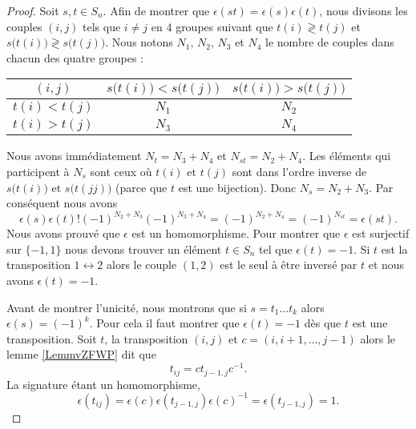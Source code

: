 \begin{proof}
    Soit \( s,t\in S_n\). Afin de montrer que \( \epsilon(st)=\epsilon(s)\epsilon(t)\), nous divisons les couples \( (i,j)\) tels que \( i\neq j\) en \( 4\) groupes suivant que \( t(i)\gtrless t(j)\) et \( s\big( t(i) \big)\gtrless s\big( t(j) \big)\). Nous notons \( N_1\), \( N_2\), \( N_3\) et \( N_4\) le nombre de couples dans chacun des quatre groupes :
    \begin{center}
    \begin{tabular}{c|c|c}
        $ (i,j)$&   \( s\big( t(i) \big)<s\big( t(j) \big)\)    &   \( s\big( t(i) \big)>s\big( t(j) \big)\)\\
        \hline
        \( t(i)<t(j)\)& \( N_1\)&\( N_2\)\\
        \hline
        \( t(i)>t(j)\)&\( N_3\)&\( N_4\)
    \end{tabular}
    \end{center}
    Nous avons immédiatement \( N_t=N_3+N_4\) et \( N_{st}=N_2+N_4\). Les éléments qui participent à \( N_s\) sont ceux où \( t(i)\) et \( t(j)\) sont dans l'ordre inverse de \( s\big( t(i) \big)\) et \( s\big( t(jj) \big)\) (parce que \( t\) est une bijection). Donc \( N_s=N_2+N_3\). Par conséquent nous avons
    \begin{equation}
        \epsilon(s)\epsilon(t)!(-1)^{N_2+N_3}(-1)^{N_3+N_4}=(-1)^{N_2+N_4}=(-1)^{N_{st}}=\epsilon(st).
    \end{equation}
    Nous avons prouvé que \( \epsilon\) est un homomorphisme. Pour montrer que \( \epsilon\) est surjectif sur \( \{ -1,1 \}\) nous devons trouver un élément \( t\in S_n\) tel que \( \epsilon(t)=-1\). Si \( t\) est la transposition \( 1\leftrightarrow 2\) alors le couple \( (1,2)\) est le seul à être inversé par \( t\) et nous avons \( \epsilon(t)=-1\).
    
    Avant de montrer l'unicité, nous montrons que si \( s=t_1\ldots t_k\) alors \( \epsilon(s)=(-1)^k\). Pour cela il faut montrer que \( \epsilon(t)=-1\) dès que \( t\) est une transposition. Soit \( t\), la transposition \( (i,j)\) et \( c=(i,i+1,\ldots, j-1)\) alors le lemme \ref{LemmvZFWP} dit que
    \begin{equation}
        t_{ij}=ct_{j-1,j}c^{-1}.
    \end{equation}
    La signature étant un homomorphisme,
    \begin{equation}
        \epsilon(t_{ij})=\epsilon(c)\epsilon(t_{j-1,j})\epsilon(c)^{-1}=\epsilon(t_{j-1,j})=1.
    \end{equation}
    

\end{proof}
